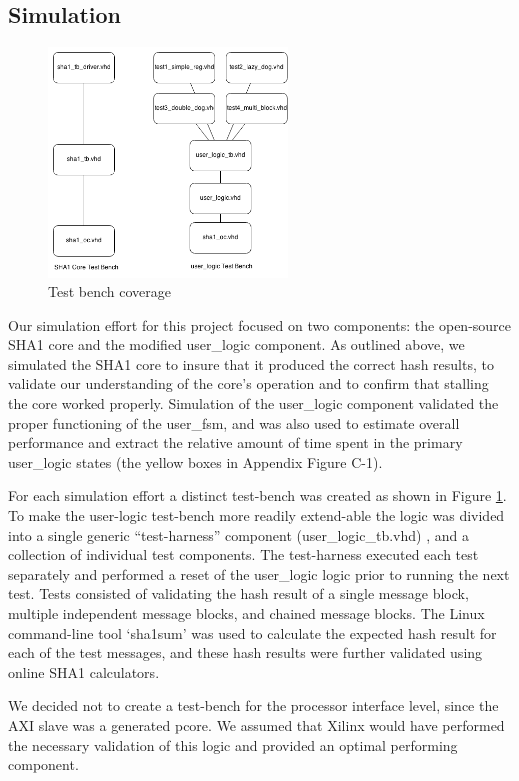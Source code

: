 \documentclass[journal]{IEEEtran}
\begin{document}
\subsection{Simulation}
\begin{figure}[ht]
\centering
\includegraphics[width=2.5in]{Test_Benches.png}
\caption{Test bench coverage}
\label{fig_TB}
\end{figure} 
Our simulation effort for this project focused on two components: the open-source SHA1 core and the modified user\_logic component.  As outlined above, we simulated the SHA1 core to insure that it produced the correct hash results, to validate our understanding of the core’s operation and to confirm that stalling the core worked properly.  Simulation of the user\_logic component validated the proper functioning of the user\_fsm, and was also used to estimate overall performance and extract the relative amount of time spent in the primary user\_logic states (the yellow boxes in Appendix Figure C-1).

For each simulation effort a distinct test-bench was created as shown in Figure \ref{fig_TB}.  To make the user-logic test-bench more readily extend-able the logic was divided into a single generic “test-harness” component (user\_logic\_tb.vhd) , and a collection of individual test components.  The test-harness executed each test separately and performed a reset of the user\_logic logic prior to running the next test.  Tests consisted of validating the hash result of a single message block, multiple independent message blocks, and chained message blocks.  The Linux command-line tool ‘sha1sum’\cite{SHASUM}  was used to calculate the expected hash result for each of the test messages, and these hash results were further validated using online SHA1 calculators\cite{SHASUMONLINE}.

We decided not to create a test-bench for the processor interface level, since the AXI slave was a generated pcore.  We assumed that Xilinx would have performed the necessary validation of this logic and provided an optimal performing component.
\end{document}
